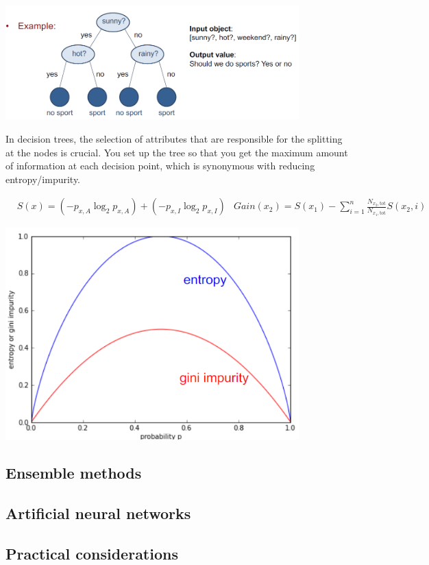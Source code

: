 \begin{center}\includegraphics[width=0.85\textwidth]{img/machine/MachineDecisionTrees.png}\end{center}

In decision trees, the selection of attributes that are responsible for the splitting at the nodes is crucial. You set up the tree so that you get the maximum amount of information at each decision point, which is synonymous with reducing entropy/impurity.

\begin{align}
    &S(x)=\left(-p_{x,A}\log_2p_{x,A}\right)+\left(-p_{x,I}\log_2p_{x,I}\right)&Gain(x_2)=S(x_1)-\sum_{i=1}^{n}\frac{N_{x_2,\mathrm{tot}}}{N_{x_1,\mathrm{tot}}}S(x_2,i)
\end{align}

\begin{center}\includegraphics[width=0.85\textwidth]{img/machine/MachineDecisionTreesEntropy.png}\end{center}


\subsection{Ensemble methods}

\subsection{Artificial neural networks}

\subsection{Practical considerations}